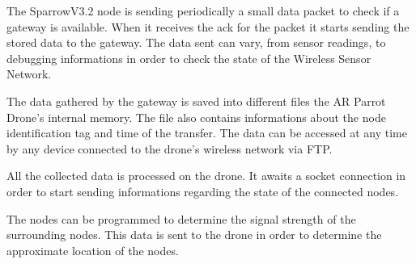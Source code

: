 The SparrowV3.2 node is sending periodically a small data packet to check if a gateway is available. When it receives the ack for the packet it starts sending the stored data to the gateway. The data sent can vary, from sensor readings, to debugging informations in order to check the state of the Wireless Sensor Network.

The data gathered by the gateway is saved into different files the AR Parrot Drone's internal memory. The file also contains informations about the node identification tag and time of the transfer. The data can be accessed at any time by any device connected to the drone's wireless network via FTP.



All the collected data is processed on the drone. It awaits a socket connection in order to start sending informations regarding the state of the connected nodes.

The nodes can be programmed to determine the signal strength of the surrounding nodes. This data is sent to the drone in order to determine the approximate location of the nodes\cite{savarese2001location}.

